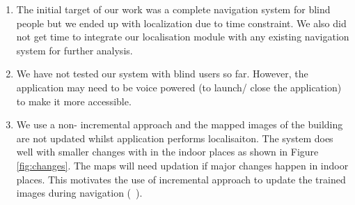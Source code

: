 \begin{enumerate}
\item The initial target of our work 
was a complete navigation system for 
blind people but  we ended up with localization
due to time constraint. We also did not 
get time to integrate our localisation 
module with any existing navigation system for further 
analysis. 

\item We have not tested our system with blind 
users so far. However, the application may need to 
be voice powered (to launch/ close the application) 
to make it more accessible.

\item We use a non- incremental approach 
and the mapped images of the building are not 
updated whilst application performs localisaiton. 
The system does well with smaller changes with in the indoor 
places as shown in Figure \ref{fig:changes}. 
The maps will need updation 
if major changes happen in 
indoor places. This motivates the use 
of incremental approach to update the trained 
images during navigation (~\cite{angeli08}).
 

\end{enumerate}

